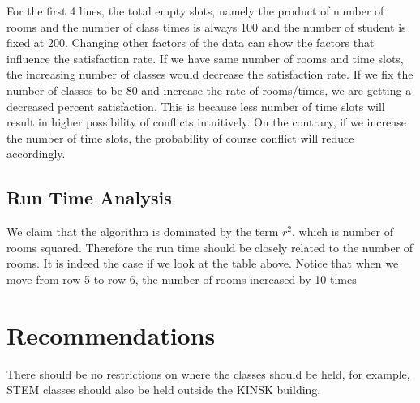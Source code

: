 \documentclass[11pt, oneside]{article}   	%
\begin{document}
For the first 4 lines, the total empty slots, namely the product of number of rooms and the number of class times is always 100 and the number of student is fixed at 200. Changing other factors of the data can show the factors that influence the satisfaction rate. If we have same number of rooms and time slots, the increasing number of classes would decrease the satisfaction rate. If we fix the number of classes to be 80 and increase the rate of rooms/times, we are getting a decreased percent satisfaction. This is because less number of time slots will result in higher possibility of conflicts intuitively. On the contrary, if we increase the number of time slots, the probability of course conflict will reduce accordingly.
\subsection{Run Time Analysis}
We claim that the algorithm is dominated by the term $r^2$, which is number of rooms squared. Therefore the run time should be closely related to the number of rooms. It is indeed the case if we look at the table above. Notice that when we move from row 5 to row 6, the number of rooms increased by 10 times



\section{Recommendations}
There should be no restrictions on where the classes should be held, for example, STEM classes should also be held outside the KINSK building. 
\end{document}
